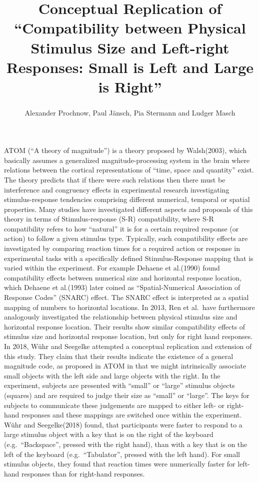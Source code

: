 \documentclass[
  english,
  man,floatsintext]{apa6}
\title{Conceptual Replication of ``Compatibility between Physical Stimulus Size and Left-right Responses: Small is Left and Large is Right''}
\author{Alexander Prochnow, Paul Jänsch, Pia Stermann and Ludger Masch\textsuperscript{}}
\date{}
\affiliation{\vspace{0.5cm}\textsuperscript{} University of Osnabrück}
\begin{document}
\maketitle

ATOM (\enquote{A theory of magnitude}) is a theory proposed by Walsh(2003), which basically assumes a generalized magnitude-processing system in the brain where relations between the cortical representations of \enquote{time, space and quantity} exist. The theory predicts that if there were such relations then there must be interference and congruency effects in experimental research investigating stimulus-response tendencies comprising different numerical, temporal or spatial properties.
Many studies have investigated different aspects and proposals of this theory in terms of Stimulus-response (S-R) compatibility, where S-R compatibility refers to how \enquote{natural} it is for a certain required response (or action) to follow a given stimulus type. Typically, such compatibility effects are investigated by comparing reaction times for a required action or response in experimental tasks with a specifically defined Stimulus-Response mapping that is varied within the experiment. For example Dehaene et al.(1990) found compatibility effects between numerical size and horizontal response location, which Dehaene et al.(1993) later coined as \enquote{Spatial-Numerical Association of Response Codes} (SNARC) effect. The SNARC effect is interpreted as a spatial mapping of numbers to horizontal locations.
In 2013, Ren et al.~have furthermore analogously investigated the relationship between physical stimulus size and horizontal response location. Their results show similar compatibility effects of stimulus size and horizontal response location, but only for right hand responses. In 2018, Wühr and Seegelke attempted a conceptual replication and extension of this study. They claim that their results indicate the existence of a general magnitude code, as proposed in ATOM in that we might intrinsically associate small objects with the left side and large objects with the right.
In the experiment, subjects are presented with \enquote{small} or \enquote{large} stimulus objects (squares) and are required to judge their size as \enquote{small} or \enquote{large}. The keys for subjects to communicate these judgements are mapped to either left- or right-hand responses and these mappings are switched once within the experiment. Wühr and Seegelke(2018) found, that participants were faster to respond to a large stimulus object with a key that is on the right of the keyboard (e.g.~\enquote{Backspace}, pressed with the right hand), than with a key that is on the left of the keyboard (e.g.~\enquote{Tabulator}, pressed with the left hand). For small stimulus objects, they found that reaction times were numerically faster for left-hand responses than for right-hand responses.
\end{document}
